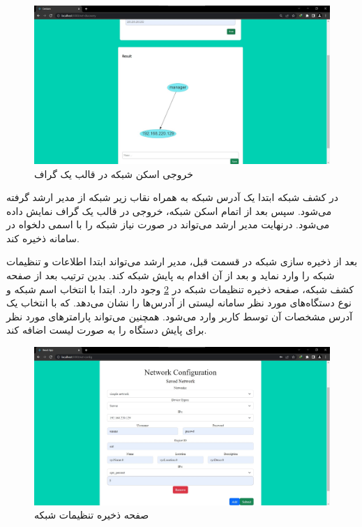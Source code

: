 \begin{figure}[!h]
    \centering\includegraphics[scale=.38]{./net-dis-after}
    \caption{خروجی اسکن شبکه در قالب یک گراف}\label{fig.16}
\end{figure}

\cleardoublepage

در کشف شبکه ابتدا یک آدرس شبکه به همراه نقاب زیر شبکه از مدیر ارشد گرفته می‌شود. سپس بعد از اتمام اسکن شبکه، خروجی در قالب یک گراف نمایش داده می‌شود. درنهایت مدیر ارشد می‌تواند در صورت نیاز شبکه را با اسمی دلخواه در سامانه ذخیره کند.


بعد از ذخیره‌ سازی شبکه در قسمت قبل، مدیر ارشد می‌تواند ابتدا اطلاعات و تنظیمات شبکه را وارد نماید و بعد از آن اقدام به پایش شبکه کند. بدین ترتیب بعد از صفحه کشف شبکه، صفحه ذخیره تنظیمات شبکه در \cref{fig.17} وجود دارد. ابتدا با انتخاب اسم شبکه و نوع دستگاه‌های مورد نظر سامانه لیستی از آدرس‌ها را نشان می‌دهد. که با انتخاب یک آدرس مشخصات آن توسط کاربر وارد می‌شود. همچنین می‌تواند پارامترهای مورد نظر برای پایش دستگاه را به صورت لیست اضافه کند.



\begin{figure}[!h]
    \centering\includegraphics[scale=.38]{./net-config}
    \caption{صفحه ذخیره تنظیمات شبکه}\label{fig.17}
\end{figure}


